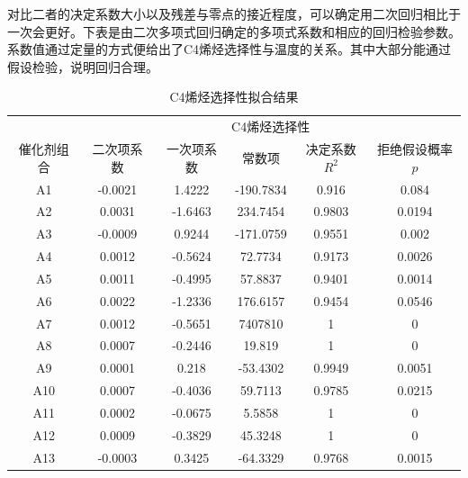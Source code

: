 \documentclass{article}
\begin{document}
	\newpage
	对比二者的决定系数大小以及残差与零点的接近程度，可以确定用二次回归相比于一次会更好。下表是由二次多项式回归确定的多项式系数和相应的回归检验参数。系数值通过定量的方式便给出了C4烯烃选择性与温度的关系。其中大部分能通过假设检验，说明回归合理。
	\begin{table}[!h]
		\centering
		\caption{C4烯烃选择性拟合结果}
		\begin{tabular}{|c|c|c|c|c|c|}
			\hline
			& \multicolumn{5}{c|}{C4烯烃选择性}                                       \\ \cline{2-6} 
			\multirow{-2}{*}{催化剂组合}    & 二次项系数   & 一次项系数   & 常数项       & 决定系数$R^2$ & 拒绝假设概率$p$ \\ \hline
			A1                         & -0.0021 & 1.4222  & -190.7834 & 0.916                    & 0.084   \\ \hline
			A2                         & 0.0031  & -1.6463 & 234.7454  & 0.9803                   & 0.0194  \\ \hline
			A3                         & -0.0009 & 0.9244  & -171.0759 & 0.9551                   & 0.002   \\ \hline
			A4                         & 0.0012  & -0.5624 & 72.7734   & 0.9173                   & 0.0026  \\ \hline
			A5                         & 0.0011  & -0.4995 & 57.8837   & 0.9401                   & 0.0014  \\ \hline
			A6                         & 0.0022  & -1.2336 & 176.6157  & 0.9454                   & 0.0546  \\ \hline
			A7                         & 0.0012  & -0.5651 & 7407810   & 1                        & 0       \\ \hline
			A8                         & 0.0007  & -0.2446 & 19.819    & 1                        & 0       \\ \hline
			A9                         & 0.0001  & 0.218   & -53.4302  & 0.9949                   & 0.0051  \\ \hline
			A10                        & 0.0007  & -0.4036 & 59.7113   & 0.9785                   & 0.0215  \\ \hline
			A11						   & 0.0002  & -0.0675 & 5.5858    & 1                        & 0       \\ \hline
			A12                        & 0.0009  & -0.3829 & 45.3248   & 1                        & 0       \\ \hline
			A13                        & -0.0003 & 0.3425  & -64.3329  & 0.9768                   & 0.0015  \\ \hline

\end{tabular}
\end{table}
\end{document}
